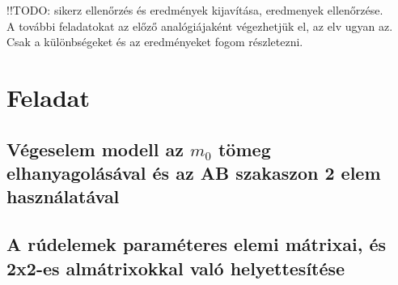 \documentclass{article}
\begin{document}
		!!TODO: sikerz ellenőrzés és eredmények kijavítása, eredmenyek ellenőrzése. \\
		
		
		
		A további feladatokat az előző analógiájaként végezhetjük el, az elv ugyan az. 
		Csak a különbségeket és az eredményeket fogom részletezni.
	
	
	\section{Feladat}
		
	\subsection{Végeselem modell az $m_{0}$ tömeg elhanyagolásával és az \textbf{AB} szakaszon 2 elem használatával}
	
		\begin{figure}[h!]		
			\begin{center}	
			\end{center}	
		\caption{}
		\end{figure}
	
	
		\subsection{A rúdelemek paraméteres elemi mátrixai, és 2x2-es almátrixokkal való helyettesítése}
	
\end{document}
